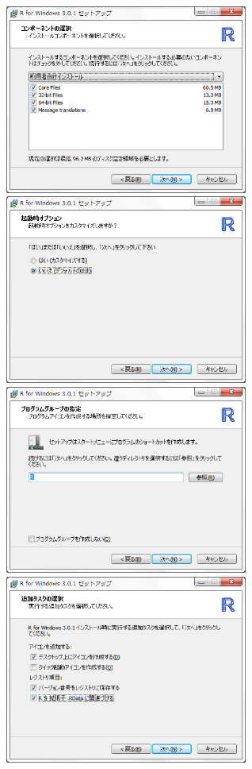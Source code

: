 \documentclass[a4paper,10pt,fleqn]{jarticle}
\begin{document}
\includegraphics[width=8cm]{img/windows/win006.eps}\hspace{0.8em} \includegraphics[width=8cm]{img/windows/win007.eps}\\

\includegraphics[width=8cm]{img/windows/win008.eps}\hspace{0.8em} \includegraphics[width=8cm]{img/windows/win009.eps}\\
\end{document}
